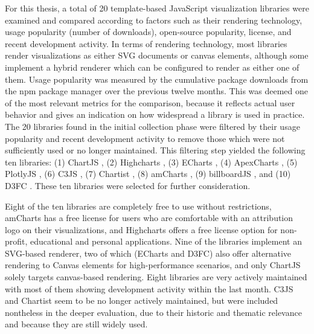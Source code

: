 For this thesis, a total of 20 template-based JavaScript visualization
libraries were examined and compared according to factors such as
their rendering technology, usage popularity (number of downloads),
open-source popularity, license, and recent development activity.  In
terms of rendering technology, most libraries render visualizations as
either SVG documents or canvas elements, although some implement a
hybrid renderer which can be configured to render as either one of
them. Usage popularity was measured by the cumulative package
downloads from the npm package manager over the previous twelve
months. This was deemed one of the most relevant metrics for the
comparison, because it reflects actual user behavior and gives an
indication on how widespread a library is used in practice. The 20
libraries found in the initial collection phase were filtered by their
usage popularity and recent development activity to remove those which
were not sufficiently used or no longer maintained. This filtering
step yielded the following ten libraries: (1) ChartJS
\parencite{ChartJS}, (2) Highcharts \parencite{Highcharts}, (3)
ECharts \parencite{ECharts}, (4) ApexCharts \parencite{ApexCharts},
(5) PlotlyJS \parencite{PlotlyJS}, (6) C3JS \parencite{C3JS}, (7)
Chartist \parencite{Chartist}, (8) amCharts \parencite{amCharts}, (9)
billboardJS \parencite{billboardJS}, and (10) D3FC \parencite{D3FC}.
These ten libraries were selected for further consideration.

Eight of the ten libraries are completely free to use without
restrictions, amCharts has a free license for users who are
comfortable with an attribution logo on their visualizations, and
Highcharts offers a free license option for non-profit, educational
and personal applications. Nine of the libraries implement an
SVG-based renderer, two of which (ECharts and D3FC) also offer
alternative rendering to Canvas elements for high-performance
scenarios, and only ChartJS solely targets canvas-based rendering.
Eight libraries are very actively maintained with most of them showing
development activity within the last month. C3JS and Chartist seem to
be no longer actively maintained, but were included nontheless in the
deeper evaluation, due to their historic and thematic relevance and
because they are still widely used.

